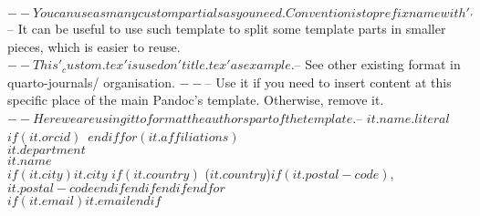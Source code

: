 $-- You can use as many custom partials as you need. Convention is to prefix name with '_'
$-- It can be useful to use such template to split some template parts in smaller pieces, which is easier to reuse.
$-- This '_custom.tex' is used on 'title.tex' as example.
$-- See other existing format in quarto-journals/ organisation.
$-- %
$-- Use it if you need to insert content at this specific place of the main Pandoc's template. Otherwise, remove it.
$-- Here we are using it to format the authors part of the template.
$-- %
\textbf{$it.name.literal$}$if(it.orcid)$~$endif$$for(it.affiliations)$\\$it.department$\\$it.name$\\$if(it.city)$$it.city$ $if(it.country)$ ($it.country$)$if(it.postal-code)$,\ $it.postal-code$$endif$$endif$$endif$$endfor$\\$if(it.email)$\href{mailto:$it.email$}{$it.email$}$endif$
